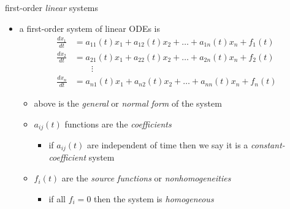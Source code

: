 \documentclass[urlcolor=blue,dvipsnames]{beamer}
\begin{document}
\begin{frame}{first-order \emph{linear} systems}

\begin{itemize}
\item a \alert{first-order system of linear ODEs} is
\begin{align*}
\frac{dx_1}{dt} &= a_{11}(t) x_1 + a_{12}(t) x_2 + \dots + a_{1n}(t) x_n + f_1(t) \\
\frac{dx_2}{dt} &= a_{21}(t) x_1 + a_{22}(t) x_2 + \dots + a_{2n}(t) x_n + f_2(t) \\
                &\qquad \vdots \\
\frac{dx_n}{dt} &= a_{n1}(t) x_1 + a_{n2}(t) x_2 + \dots + a_{nn}(t) x_n + f_n(t)
\end{align*}
     \begin{itemize}
     \item above is the \emph{general} or \emph{normal form} of the system
     \item $a_{ij}(t)$ functions are the \emph{coefficients}
         \begin{itemize}
         \item if $a_{ij}(t)$ are independent of time then we say it is a \emph{constant-coefficient} system
         \end{itemize}
     \item $f_i(t)$ are the \emph{source functions} or \emph{nonhomogeneities}
         \begin{itemize}
         \item if all $f_i=0$ then the system is \emph{homogeneous}
         \end{itemize}
     \end{itemize}
\end{itemize}
\end{frame}
\end{document}
